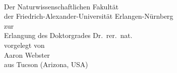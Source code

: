 \begin{titlepage}
  \begin{center}
    \hfill\\[2cm]
    {\Huge {\bfseries \textsc {\distitle}} \par}
    \vspace{11.0cm}
    {\large
      Der Naturwissenschaftlichen Fakultät\\
      der Friedrich-Alexander-Universität Erlangen-Nürnberg\\
      zur\\
      Erlangung des Doktorgrades Dr.\ rer.\ nat.\ \\
      vorgelegt von\\
      Aaron Webster\\
      aus Tucson (Arizona, USA)
    }
  \end{center}
  \tikzexternaldisable{}
  \tikzexternalenable{}
\end{titlepage}

